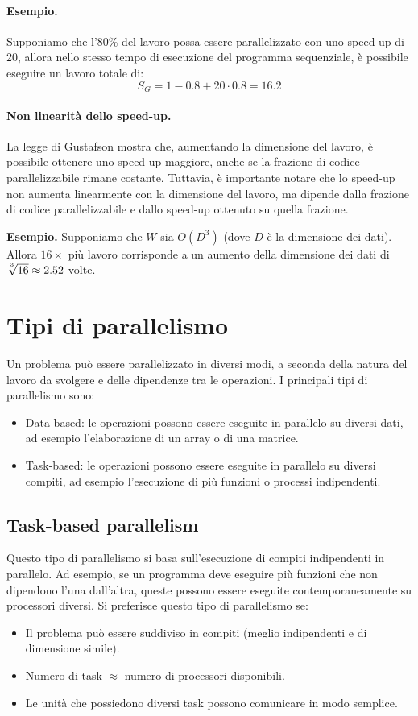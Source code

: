 \paragraph{Esempio.}
Supponiamo che l'80\% del lavoro possa essere parallelizzato con uno speed-up di 20, allora nello stesso tempo di esecuzione del programma sequenziale, è possibile eseguire un lavoro totale di:
\[
S_G = 1 - 0.8 + 20 \cdot 0.8 = 16.2
\]

\paragraph{Non linearità dello speed-up.}
La legge di Gustafson mostra che, aumentando la dimensione del lavoro, è possibile ottenere uno speed-up maggiore, anche se la frazione di codice parallelizzabile rimane costante. Tuttavia, è importante notare che lo speed-up non aumenta linearmente con la dimensione del lavoro, ma dipende dalla frazione di codice parallelizzabile e dallo speed-up ottenuto su quella frazione.

\medskip
\noindent
\textbf{Esempio.}
Supponiamo che $W$ sia $O(D^3)$ (dove $D$ è la dimensione dei dati). Allora $16 \times$ più lavoro corrisponde a un aumento della dimensione dei dati di $\root^3\of{16} \approx 2.52$ volte.

\section{Tipi di parallelismo}
Un problema può essere parallelizzato in diversi modi, a seconda della natura del lavoro da svolgere e delle dipendenze tra le operazioni. I principali tipi di parallelismo sono:
\begin{itemize}
    \item Data-based: le operazioni possono essere eseguite in parallelo su diversi dati, ad esempio l'elaborazione di un array o di una matrice.
    \item Task-based: le operazioni possono essere eseguite in parallelo su diversi compiti, ad esempio l'esecuzione di più funzioni o processi indipendenti.
\end{itemize}

\subsection{Task-based parallelism}
Questo tipo di parallelismo si basa sull'esecuzione di compiti indipendenti in parallelo. Ad esempio, se un programma deve eseguire più funzioni che non dipendono l'una dall'altra, queste possono essere eseguite contemporaneamente su processori diversi. Si preferisce questo tipo di parallelismo se:
\begin{itemize}
    \item Il problema può essere suddiviso in compiti (meglio indipendenti e di dimensione simile).
    \item Numero di task $\approx$ numero di processori disponibili.
    \item Le unità che possiedono diversi task possono comunicare in modo semplice.
\end{itemize}


